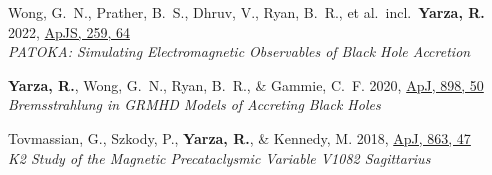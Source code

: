 \item Wong, G.~N., Prather, B.~S., Dhruv, V., Ryan, B.~R., et al.\ incl.\ \textbf{Yarza, R.} 2022, \href{https://ui.adsabs.harvard.edu/abs/2022ApJS..259...64W}{ApJS, 259, 64}\\\textit{PATOKA\@: Simulating Electromagnetic Observables of Black Hole Accretion}

\item \textbf{Yarza, R.}, Wong, G.~N., Ryan, B.~R., \& Gammie, C.~F. 2020, \href{https://ui.adsabs.harvard.edu/abs/2020ApJ...898...50Y}{ApJ, 898, 50}\\\textit{Bremsstrahlung in GRMHD Models of Accreting Black Holes}

\item Tovmassian, G., Szkody, P., \textbf{Yarza, R.}, \& Kennedy, M. 2018, \href{https://ui.adsabs.harvard.edu/abs/2018ApJ...863...47T}{ApJ, 863, 47}\\\textit{K2 Study of the Magnetic Precataclysmic Variable V1082 Sagittarius}

